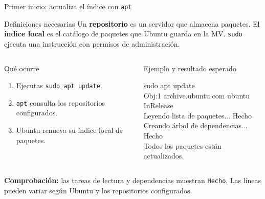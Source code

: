 \documentclass[aspectratio=169,10pt,c]{beamer}
\begin{document}
\begin{frame}{Primer inicio: actualiza el índice con \texttt{apt}}
\begin{block}{Definiciones necesarias}
\small Un \textbf{repositorio} es un servidor que almacena paquetes. El \textbf{índice local} es el catálogo de paquetes que Ubuntu guarda en la MV. \texttt{sudo} ejecuta una instrucción con permisos de administración.
\end{block}
\begin{columns}[T,onlytextwidth]
\begin{block}{Qué ocurre}
\begin{enumerate}\small
  \item Ejecutas \texttt{sudo apt update}.
  \item \texttt{apt} consulta los repositorios configurados.
  \item Ubuntu renueva su índice local de paquetes.
\end{enumerate}
\end{block}
\begin{exampleblock}{Ejemplo y resultado esperado}
\begin{terminal}
\small sudo apt update\\
Obj:1 archive.ubuntu.com ubuntu InRelease\\
Leyendo lista de paquetes... Hecho\\
Creando árbol de dependencias... Hecho\\
Todos los paquetes están actualizados.
\end{terminal}
\end{exampleblock}
\end{columns}
\small\textbf{Comprobación:} las tareas de lectura y dependencias muestran \texttt{Hecho}. Las líneas pueden variar según Ubuntu y los repositorios configurados.
\end{frame}
\end{document}
